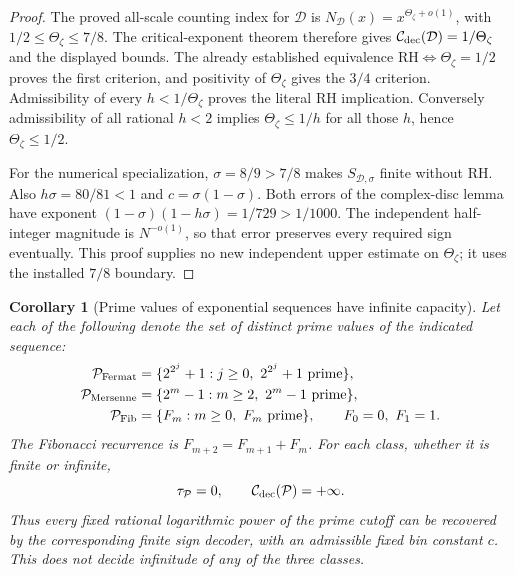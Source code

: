\documentclass[11pt]{article}
\newtheorem{corollary}[theorem]{Corollary}
\theoremstyle{definition}
\begin{document}
\begin{proof}
The proved all-scale counting index for $\mathcal D$ is
$N_{\mathcal D}(x)=x^{\Theta_\zeta+o(1)}$, with
$1/2\le\Theta_\zeta\le7/8$.
The critical-exponent theorem therefore gives
$\mathcal C_{\rm dec}(\mathcal D)=1/\Theta_\zeta$ and the
displayed bounds.
The already established equivalence
$ \mathrm{RH}\Longleftrightarrow\Theta_\zeta=1/2$ proves the
first criterion, and positivity of $\Theta_\zeta$ gives the
$3/4$ criterion.
Admissibility of every $h<1/\Theta_\zeta$ proves the literal
RH implication.
Conversely admissibility of all rational $h<2$ implies
$\Theta_\zeta\le1/h$ for all those $h$, hence
$\Theta_\zeta\le1/2$.

For the numerical specialization, $\sigma=8/9>7/8$ makes
$S_{\mathcal D,\sigma}$ finite without RH.
Also $h\sigma=80/81<1$ and
$c=\sigma(1-\sigma)$.
Both errors of the complex-disc lemma have exponent
$(1-\sigma)(1-h\sigma)=1/729>1/1000$.
The independent half-integer magnitude is $N^{-o(1)}$,
so that error preserves every required sign eventually.
This proof supplies no new independent upper estimate on
$\Theta_\zeta$; it uses the installed $7/8$ boundary.
\end{proof}

\begin{corollary}[Prime values of exponential sequences have infinite capacity]
\label{cor:prime-decoding-sparse-special-classes}
Let each of the following denote the set of distinct
\emph{prime values} of the indicated sequence:
\[
 \begin{aligned}
 \mathcal P_{\rm Fermat}
   &=\{2^{2^j}+1:j\ge0,\ 2^{2^j}+1\text{ prime}\},\\
 \mathcal P_{\rm Mersenne}
   &=\{2^m-1:m\ge2,\ 2^m-1\text{ prime}\},\\
 \mathcal P_{\rm Fib}
   &=\{F_m:m\ge0,\ F_m\text{ prime}\},
       \qquad F_0=0,\ F_1=1 .
 \end{aligned}
\]
The Fibonacci recurrence is $F_{m+2}=F_{m+1}+F_m$.
For each class, whether it is finite or infinite,
\begin{equation}
                \tau_{\mathcal P}=0,\qquad
                \mathcal C_{\rm dec}(\mathcal P)=+\infty .
 \label{eq:prime-decoding-special-capacities}
\end{equation}
Thus every fixed rational logarithmic power of the prime
cutoff can be recovered by the corresponding finite sign
decoder, with an admissible fixed bin constant $c$.
This does not decide infinitude of any of the three classes.
\end{corollary}
\end{document}
